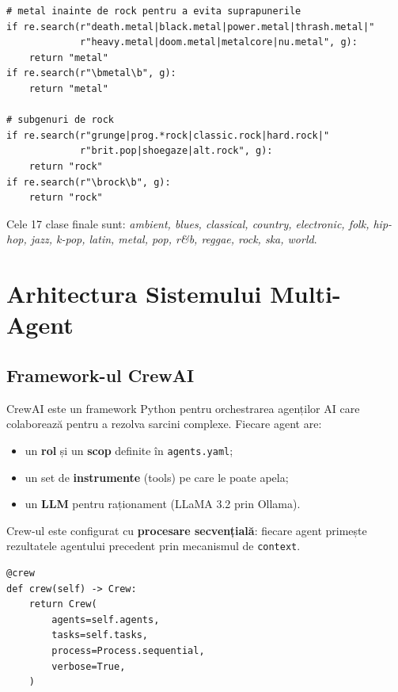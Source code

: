 \documentclass[12pt,a4paper]{report}
\begin{document}
\begin{lstlisting}[style=python, caption={Fragment din \_consolidate\_genre() — prioritate metal > rock}]
# metal inainte de rock pentru a evita suprapunerile
if re.search(r"death.metal|black.metal|power.metal|thrash.metal|"
             r"heavy.metal|doom.metal|metalcore|nu.metal", g):
    return "metal"
if re.search(r"\bmetal\b", g):
    return "metal"

# subgenuri de rock
if re.search(r"grunge|prog.*rock|classic.rock|hard.rock|"
             r"brit.pop|shoegaze|alt.rock", g):
    return "rock"
if re.search(r"\brock\b", g):
    return "rock"
\end{lstlisting}

Cele 17 clase finale sunt: \textit{ambient, blues, classical, country,
electronic, folk, hip-hop, jazz, k-pop, latin, metal, pop, r\&b, reggae,
rock, ska, world}.

\chapter{Arhitectura Sistemului Multi-Agent}

\section{Framework-ul CrewAI}

CrewAI este un framework Python pentru orchestrarea agenților AI care
colaborează pentru a rezolva sarcini complexe. Fiecare agent are:
\begin{itemize}[noitemsep]
    \item un \textbf{rol} și un \textbf{scop} definite în \texttt{agents.yaml};
    \item un set de \textbf{instrumente} (tools) pe care le poate apela;
    \item un \textbf{LLM} pentru raționament (LLaMA 3.2 prin Ollama).
\end{itemize}

Crew-ul este configurat cu \textbf{procesare secvențială}: fiecare agent
primește rezultatele agentului precedent prin mecanismul de \texttt{context}.

\begin{lstlisting}[style=python, caption={Definirea crew-ului în crew.py}]
@crew
def crew(self) -> Crew:
    return Crew(
        agents=self.agents,
        tasks=self.tasks,
        process=Process.sequential,
        verbose=True,
    )
\end{lstlisting}
\end{document}
